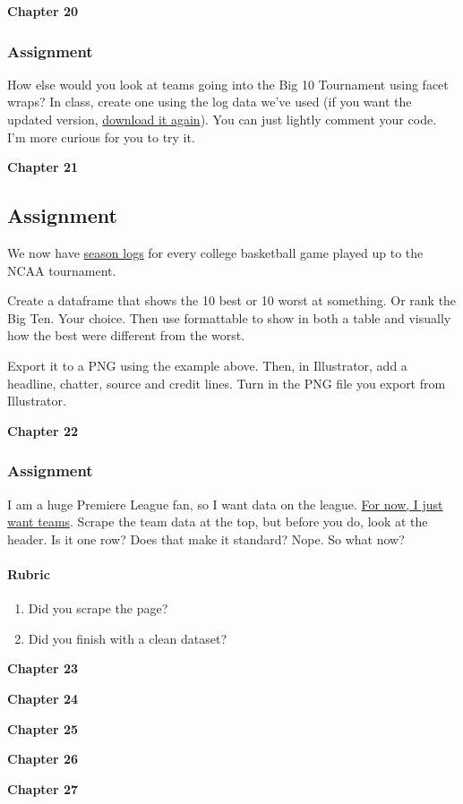 \documentclass[]{book}
\providecommand{\tightlist}{%
  \setlength{\itemsep}{0pt}\setlength{\parskip}{0pt}}
\let\oldparagraph\paragraph
\renewcommand{\paragraph}[1]{\oldparagraph{#1}\mbox{}}
\begin{document}
\textbf{Chapter 20}

\subsubsection{Assignment}\label{assignment-13}

How else would you look at teams going into the Big 10 Tournament using
facet wraps? In class, create one using the log data we've used (if you
want the updated version,
\href{https://www.dropbox.com/s/0lpvstsjziz5k6p/logs.csv?dl=0}{download
it again}). You can just lightly comment your code. I'm more curious for
you to try it.

\textbf{Chapter 21}

\subsection{Assignment}\label{assignment-14}

We now have
\href{https://www.dropbox.com/s/0lpvstsjziz5k6p/logs.csv?dl=0}{season
logs} for every college basketball game played up to the NCAA
tournament.

Create a dataframe that shows the 10 best or 10 worst at something. Or
rank the Big Ten. Your choice. Then use formattable to show in both a
table and visually how the best were different from the worst.

Export it to a PNG using the example above. Then, in Illustrator, add a
headline, chatter, source and credit lines. Turn in the PNG file you
export from Illustrator.

\textbf{Chapter 22}

\subsubsection{Assignment}\label{assignment-15}

I am a huge Premiere League fan, so I want data on the league.
\href{https://fbref.com/en/comps/9/stats/Premier-League-Stats}{For now,
I just want teams}. Scrape the team data at the top, but before you do,
look at the header. Is it one row? Does that make it standard? Nope. So
what now?

\paragraph{Rubric}\label{rubric-10}

\begin{enumerate}
\def\labelenumi{\arabic{enumi}.}
\tightlist
\item
  Did you scrape the page?
\item
  Did you finish with a clean dataset?
\end{enumerate}

\textbf{Chapter 23}

\textbf{Chapter 24}

\textbf{Chapter 25}

\textbf{Chapter 26}

\textbf{Chapter 27}


\end{document}
